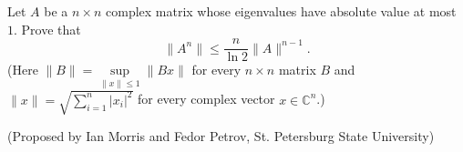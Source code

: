 Let $A$ be a $n\times n$ complex matrix whose eigenvalues have absolute value at most $1$. Prove that $$ \|A^n\|\le \dfrac{n}{\ln 2} \|A\|^{n-1}. $$(Here $\|B\|=\sup\limits_{\|x\|\leq 1} \|Bx\|$ for every $n\times n$ matrix $B$ and $\|x\|=\sqrt{\sum\limits_{i=1}^n |x_i|^2}$ for every complex vector $x\in\mathbb{C}^n$.)

(Proposed by Ian Morris and Fedor Petrov, St. Petersburg State University)